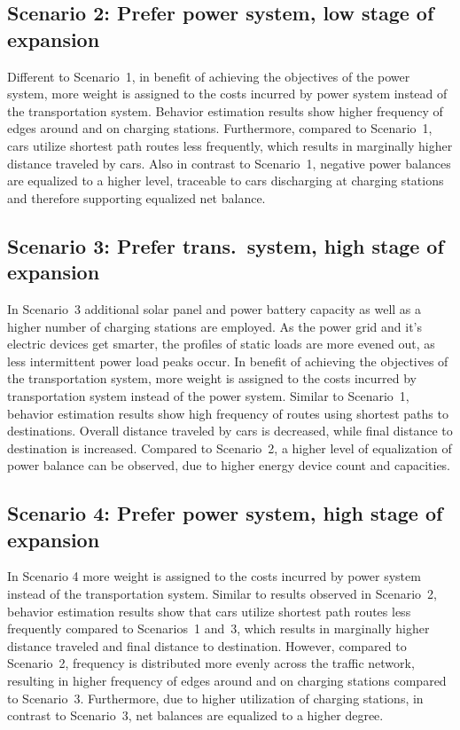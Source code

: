 \subsection*{Scenario 2: Prefer power system, low stage of expansion}

Different to Scenario~1, in benefit of achieving the objectives of the power system, more weight is assigned to the costs incurred by power system instead of the transportation system. Behavior estimation results show higher frequency of edges around and on charging stations. Furthermore, compared to Scenario~1, cars utilize shortest path routes less frequently, which results in marginally higher distance traveled by cars. Also in contrast to Scenario~1, negative power balances are equalized to a higher level, traceable to cars discharging at charging stations and therefore supporting equalized net balance.

\subsection*{Scenario 3: Prefer trans.\ system, high stage of expansion}

In Scenario~3 additional solar panel and power battery capacity as well as a higher number of charging stations are employed. As the power grid and it's electric devices get smarter, the profiles of static loads are more evened out, as less intermittent power load peaks occur. In benefit of achieving the objectives of the transportation system, more weight is assigned to the costs incurred by transportation system instead of the power system. Similar to Scenario~1, behavior estimation results show high frequency of routes using shortest paths to destinations. Overall distance traveled by cars is decreased, while final distance to destination is increased. Compared to Scenario~2, a higher level of equalization of power balance can be observed, due to higher energy device count and capacities.

\subsection*{Scenario 4: Prefer power system, high stage of expansion}

In Scenario 4 more weight is assigned to the costs incurred by power system instead of the transportation system. Similar to results observed in Scenario~2, behavior estimation results show that cars utilize shortest path routes less frequently compared to Scenarios~1 and~3, which results in marginally higher distance traveled and final distance to destination. However, compared to Scenario~2, frequency is distributed more evenly across the traffic network, resulting in higher frequency of edges around and on charging stations compared to Scenario~3. Furthermore, due to higher utilization of charging stations, in contrast to Scenario~3, net balances are equalized to a higher degree.